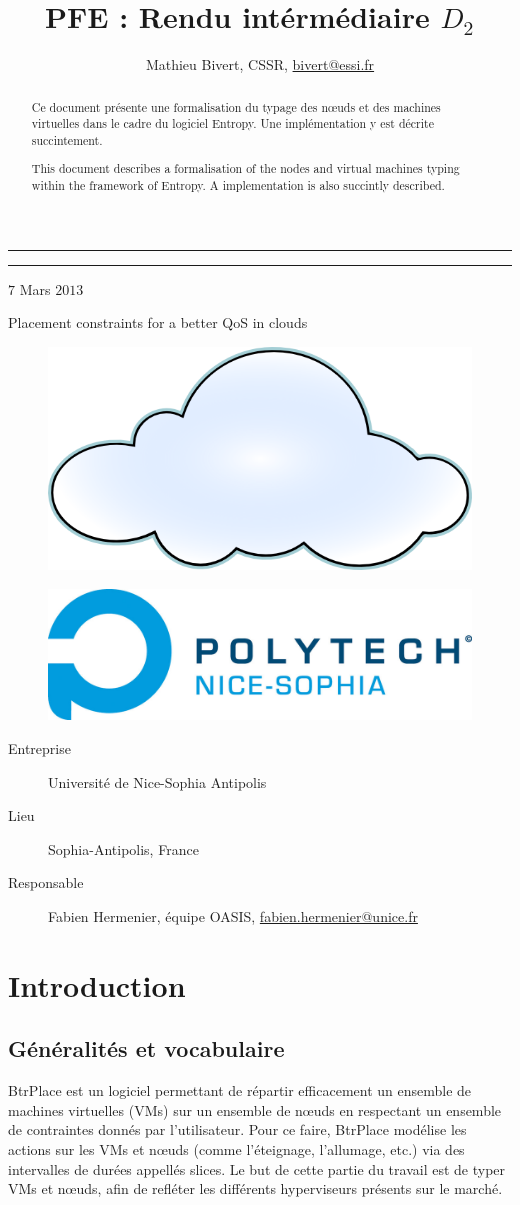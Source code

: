 \documentclass[a4paper]{article}
\author{Mathieu Bivert, CSSR, \href{mailto:bivert@essi.fr}{bivert@essi.fr}}
\title{PFE : Rendu intérmédiaire $D_2$}
\makeatletter
\def\maketitle{%
  \null
  \thispagestyle{empty}%
  \vskip 1cm
  \begin{flushright}
        \normalfont\Large\@author
  \end{flushright}
  \vfil
  \hrule height 2pt
  \par
  \begin{center}
        \huge \strut \@title \par
  \end{center}
  \hrule height 2pt
  \begin{center}
  		$7$ Mars $2013$
  \end{center}
  \par
  \vfil
  \vfil
  \null
\begin{center}
\Huge{Placement constraints for a better QoS in clouds}
\end{center}
\begin{figure}[!ht]
	\centering
	\includegraphics[scale=.45]{imgs/cloud.png}
\end{figure}
\vfil
\begin{figure}[!ht]
	\centering
	\includegraphics[scale=.5]{imgs/polytech.png}
\end{figure}
\vfil
\begin{description}
	\item[Entreprise] Université de Nice-Sophia Antipolis
	\item[Lieu] Sophia-Antipolis, France
	\item[Responsable] Fabien Hermenier, équipe OASIS,
		\href{mailto:fabien.hermenier@unice.fr}{fabien.hermenier@unice.fr}
\end{description}
\cleardoublepage
}
\makeatother
\begin{document}
\maketitle

	\begin{abstract}
		Ce document présente une formalisation du typage des nœuds
		et des machines virtuelles dans le cadre du logiciel Entropy.
		Une implémentation y est décrite succintement.
	\end{abstract}

	\begin{abstract}
		This document describes a formalisation of the nodes and virtual
		machines typing within the framework of Entropy. A implementation
		is also succintly described.
	\end{abstract}


\tableofcontents
\newpage

\section{Introduction}
\subsection{Généralités et vocabulaire}
BtrPlace est un logiciel permettant de répartir efficacement un ensemble
de machines virtuelles (VMs) sur un ensemble de nœuds en respectant un ensemble
de contraintes donnés par l'utilisateur. Pour ce faire, BtrPlace modélise les
actions sur les VMs et nœuds (comme l'éteignage, l'allumage, etc.) via des intervalles
de durées appellés slices. Le but de cette partie du travail est de typer VMs et nœuds, afin de refléter les différents hyperviseurs présents sur le marché.
\end{document}
